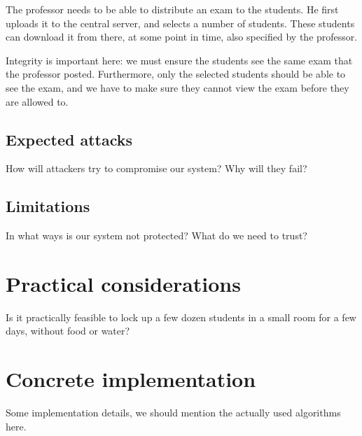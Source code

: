 \documentclass{article}
\begin{document}
The professor needs to be able to distribute an exam to the students. He first
uploads it to the central server, and selects a number of students. These
students can download it from there, at some point in time, also specified by
the professor.

Integrity is important here: we must ensure the students see the same exam that
the professor posted. Furthermore, only the selected students should be able to
see the exam, and we have to make sure they cannot view the exam before they are
allowed to.

\subsection{Expected attacks}

How will attackers try to compromise our system? Why will they fail?

\subsection{Limitations}

In what ways is our system not protected? What do we need to trust?

\section{Practical considerations}

Is it practically feasible to lock up a few dozen students in a small room for a
few days, without food or water?

\section{Concrete implementation}

Some implementation details, we should mention the actually used algorithms
here.
\end{document}
